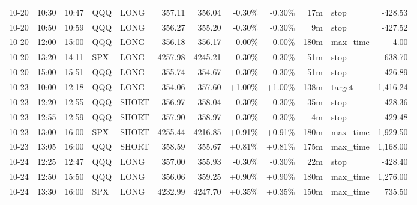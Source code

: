 \documentclass[11pt,a4paper,twoside]{article}
\begin{document}
\begin{center}
\begin{longtable}{>{\color{txtmain}}l l l l l r r r r r >{\color{txtmain}}l r}
10-20 & 10:30 & 10:47 & QQQ & LONG & 357.11 & 356.04 & \textcolor{lossred}{-0.30\%} & \textcolor{lossred}{-0.30\%} & 17m & stop & \textcolor{lossred}{-428.53} \\
10-20 & 10:50 & 10:59 & QQQ & LONG & 356.27 & 355.20 & \textcolor{lossred}{-0.30\%} & \textcolor{lossred}{-0.30\%} & 9m & stop & \textcolor{lossred}{-427.52} \\
10-20 & 12:00 & 15:00 & QQQ & LONG & 356.18 & 356.17 & \textcolor{lossred}{-0.00\%} & \textcolor{lossred}{-0.00\%} & 180m & max\_time & \textcolor{lossred}{-4.00} \\
10-20 & 13:20 & 14:11 & SPX & LONG & 4257.98 & 4245.21 & \textcolor{lossred}{-0.30\%} & \textcolor{lossred}{-0.30\%} & 51m & stop & \textcolor{lossred}{-638.70} \\
10-20 & 15:00 & 15:51 & QQQ & LONG & 355.74 & 354.67 & \textcolor{lossred}{-0.30\%} & \textcolor{lossred}{-0.30\%} & 51m & stop & \textcolor{lossred}{-426.89} \\
10-23 & 10:00 & 12:18 & QQQ & LONG & 354.06 & 357.60 & \textcolor{wingreen}{+1.00\%} & \textcolor{wingreen}{+1.00\%} & 138m & target & \textcolor{wingreen}{1,416.24} \\
10-23 & 12:20 & 12:55 & QQQ & SHORT & 356.97 & 358.04 & \textcolor{lossred}{-0.30\%} & \textcolor{lossred}{-0.30\%} & 35m & stop & \textcolor{lossred}{-428.36} \\
10-23 & 12:55 & 12:59 & QQQ & SHORT & 357.90 & 358.97 & \textcolor{lossred}{-0.30\%} & \textcolor{lossred}{-0.30\%} & 4m & stop & \textcolor{lossred}{-429.48} \\
10-23 & 13:00 & 16:00 & SPX & SHORT & 4255.44 & 4216.85 & \textcolor{wingreen}{+0.91\%} & \textcolor{wingreen}{+0.91\%} & 180m & max\_time & \textcolor{wingreen}{1,929.50} \\
10-23 & 13:05 & 16:00 & QQQ & SHORT & 358.59 & 355.67 & \textcolor{wingreen}{+0.81\%} & \textcolor{wingreen}{+0.81\%} & 175m & max\_time & \textcolor{wingreen}{1,168.00} \\
10-24 & 12:25 & 12:47 & QQQ & LONG & 357.00 & 355.93 & \textcolor{lossred}{-0.30\%} & \textcolor{lossred}{-0.30\%} & 22m & stop & \textcolor{lossred}{-428.40} \\
10-24 & 12:50 & 15:50 & QQQ & LONG & 356.06 & 359.25 & \textcolor{wingreen}{+0.90\%} & \textcolor{wingreen}{+0.90\%} & 180m & max\_time & \textcolor{wingreen}{1,276.00} \\
10-24 & 13:30 & 16:00 & SPX & LONG & 4232.99 & 4247.70 & \textcolor{wingreen}{+0.35\%} & \textcolor{wingreen}{+0.35\%} & 150m & max\_time & \textcolor{wingreen}{735.50} \\

\end{longtable}
\end{center}
\end{document}
